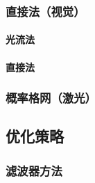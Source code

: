 \documentclass{ctexart}
\begin{document}
	\subsubsection{直接法（视觉）}
	\paragraph{光流法}
	\paragraph{直接法}
	\subsubsection{概率格网（激光）}
	\subsection{优化策略}
	\subsubsection{滤波器方法}
\end{document}

